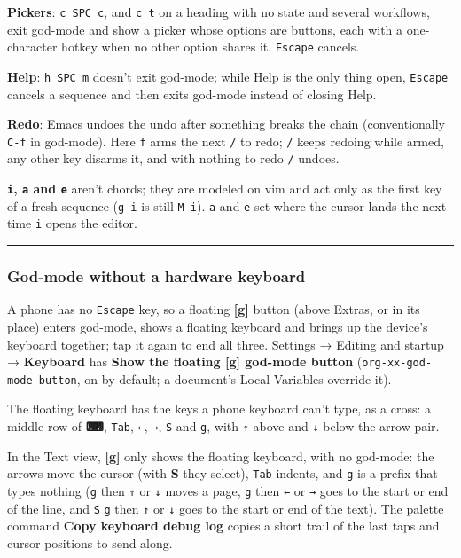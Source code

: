 \documentclass[11pt]{article}
\begin{document}
\textbf{Pickers}: \texttt{c SPC c}, and \texttt{c t} on a heading with no state and several workflows, exit god-mode and show a picker whose options are buttons, each with a one-character hotkey when no other option shares it. \texttt{Escape} cancels.

\textbf{Help}: \texttt{h SPC m} doesn't exit god-mode; while Help is the only thing open, \texttt{Escape} cancels a sequence and then exits god-mode instead of closing Help.

\textbf{Redo}: Emacs undoes the undo after something breaks the chain (conventionally \texttt{C-f} in god-mode). Here \texttt{f} arms the next \texttt{/} to redo; \texttt{/} keeps redoing while armed, any other key disarms it, and with nothing to redo \texttt{/} undoes.

\textbf{\texttt{i}, \texttt{a} and \texttt{e}} aren't chords; they are modeled on vim and act only as the first key of a fresh sequence (\texttt{g i} is still \texttt{M-i}). \texttt{a} and \texttt{e} set where the cursor lands the next time \texttt{i} opens the editor.

\noindent\rule{\textwidth}{0.5pt}

\subsubsection{God-mode without a hardware keyboard}
\label{sec:org6e28df8}
A phone has no \texttt{Escape} key, so a floating \textbf{[g]} button (above Extras, or in its place) enters god-mode, shows a floating keyboard and brings up the device's keyboard together; tap it again to end all three. Settings → Editing and startup → \textbf{Keyboard} has \textbf{Show the floating [g] god-mode button} (\texttt{org-xx-god-mode-button}, on by default; a document's Local Variables override it).

The floating keyboard has the keys a phone keyboard can't type, as a cross: a middle row of \textbf{⌨}, \texttt{Tab}, \texttt{←}, \texttt{→}, \texttt{S} and \texttt{g}, with \texttt{↑} above and \texttt{↓} below the arrow pair.

In the Text view, \textbf{[g]} only shows the floating keyboard, with no god-mode: the arrows move the cursor (with \textbf{S} they select), \texttt{Tab} indents, and \texttt{g} is a prefix that types nothing (\texttt{g} then \texttt{↑} or \texttt{↓} moves a page, \texttt{g} then \texttt{←} or \texttt{→} goes to the start or end of the line, and \texttt{S} \texttt{g} then \texttt{↑} or \texttt{↓} goes to the start or end of the text). The palette command \textbf{Copy keyboard debug log} copies a short trail of the last taps and cursor positions to send along.
\end{document}
